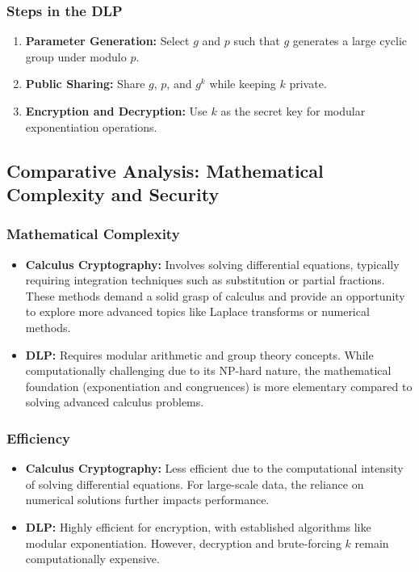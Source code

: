 \documentclass[12pt]{article}
\begin{document}
\subsubsection*{Steps in the DLP}
\begin{enumerate}
    \item \textbf{Parameter Generation:} Select \( g \) and \( p \) such that \( g \) generates a large cyclic group under modulo \( p \).
    \item \textbf{Public Sharing:} Share \( g \), \( p \), and \( g^k \) while keeping \( k \) private.
    \item \textbf{Encryption and Decryption:} Use \( k \) as the secret key for modular exponentiation operations.
\end{enumerate}

\subsection*{Comparative Analysis: Mathematical Complexity and Security}

\subsubsection*{Mathematical Complexity}
\begin{itemize}
    \item \textbf{Calculus Cryptography:} Involves solving differential equations, typically requiring integration techniques such as substitution or partial fractions. These methods demand a solid grasp of calculus and provide an opportunity to explore more advanced topics like Laplace transforms or numerical methods.
    \item \textbf{DLP:} Requires modular arithmetic and group theory concepts. While computationally challenging due to its NP-hard nature, the mathematical foundation (exponentiation and congruences) is more elementary compared to solving advanced calculus problems.
\end{itemize}

\subsubsection*{Efficiency}
\begin{itemize}
    \item \textbf{Calculus Cryptography:} Less efficient due to the computational intensity of solving differential equations. For large-scale data, the reliance on numerical solutions further impacts performance.
    \item \textbf{DLP:} Highly efficient for encryption, with established algorithms like modular exponentiation. However, decryption and brute-forcing \( k \) remain computationally expensive.
\end{itemize}
\end{document}
